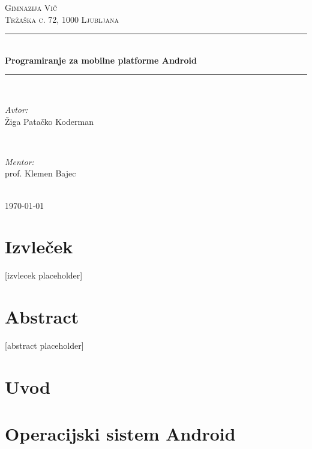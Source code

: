 \documentclass[a4paper, 12pt]{article}
\begin{document}
\begin{titlepage}
	\newcommand{\HRule}{\rule{\linewidth}{0.5mm}}
	\center

	\textsc{\LARGE Gimnazija Vič}\\[0.5cm]
	\textsc{\Large Tržaška c. 72, 1000 Ljubljana}\\[1.5cm]

	\HRule \\[0.4cm]
	{ \huge \bfseries Programiranje za mobilne platforme Android}\\[0.4cm]
	\HRule \\[1.5cm]

	\begin{minipage}{0.4\textwidth}
		\begin{flushleft} \large
			\emph{Avtor:}\\
			Žiga Patačko Koderman
		\end{flushleft}
	\end{minipage}
	~
	\begin{minipage}{0.4\textwidth}
		\begin{flushright} \large
			\emph{Mentor:} \\
			prof. Klemen Bajec
		\end{flushright}
		\end{minipage}\\[4cm]

		{\large \today}\\[3cm]

		\vfill
	\end{titlepage}

	\section*{Izvleček}
	[izvlecek placeholder]

	\section*{Abstract}
	[abstract placeholder]

	\pagebreak

	\tableofcontents
	\pagebreak

	\section{Uvod}
	

	\section{Operacijski sistem Android}
	
\end{document}
